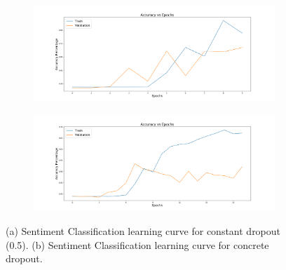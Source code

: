 \documentclass{article}
\begin{document}
\begin{figure}[!h]
\centering
\begin{subfigure}{.7\textwidth}
  \centering
  \includegraphics[width=\linewidth]{NLP2_Accuracy_2.png}
  \caption{}
\end{subfigure}%

\begin{subfigure}{.7\textwidth}
  \centering
  \includegraphics[width=\linewidth]{NLP2_Accuracy_3.png}
  \caption{}
\end{subfigure}%
\caption{(a) Sentiment Classification learning curve for constant dropout (0.5). (b) Sentiment Classification learning curve for concrete dropout.}
\label{fig:sentiment}
\end{figure}
\end{document}
